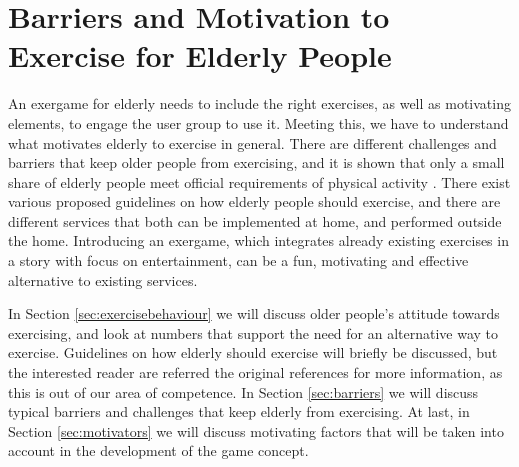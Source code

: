 \chapter{Barriers and Motivation to Exercise for Elderly People}
\label{chap:olderexercise}

An exergame for elderly needs to include the right exercises, as well as motivating elements, to engage the user group to use it. Meeting this, we have to understand what motivates elderly to exercise in general. There are different challenges and barriers that keep older people from exercising, and it is shown that only a small share of elderly people meet official requirements of physical activity \cite{statistikknorge12}. There exist various proposed guidelines on how elderly people should exercise, and there are different services that both can be implemented at home, and performed outside the home. Introducing an exergame, which integrates already existing exercises in a story with focus on entertainment, can be a fun, motivating and effective alternative to existing services.  

In Section \ref{sec:exercisebehaviour} we will discuss older people's attitude towards exercising, and look at numbers that support the need for an alternative way to exercise. Guidelines on how elderly should exercise will briefly be discussed, but the interested reader are referred the original references for more information, as this is out of our area of competence. In Section \ref{sec:barriers} we will discuss typical barriers and challenges that keep elderly from exercising. At last, in Section \ref{sec:motivators} we will discuss motivating factors that will be taken into account in the development of the game concept.  

